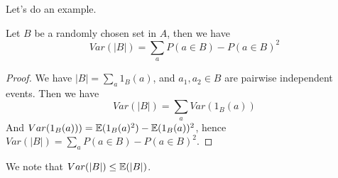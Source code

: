 Let's do an example.
\begin{example}
    Let $B$ be a randomly chosen set in $A$, then we have 
    \begin{equation*}
        Var(|B|)=\sum_a P(a\in B)-P(a\in B)^2
    \end{equation*}
\end{example}
\begin{proof}
    We have $|B|=\sum_a1_B(a)$, and $a_1, a_2\in B$ are pairwise independent events. Then we have 
    \begin{equation*}
        Var(|B|)=\sum_a Var(1_B(a))
    \end{equation*}
    And $Var(1_B(a)))=\mathbb{E}(1_B(a)^2)-\mathbb{E}(1_B(a))^2$, hence $Var(|B|)=\sum_a P(a\in B)-P(a\in B)^2$.
\end{proof}
We note that $Var(|B|)\leq\mathbb{E}(|B|)$.

